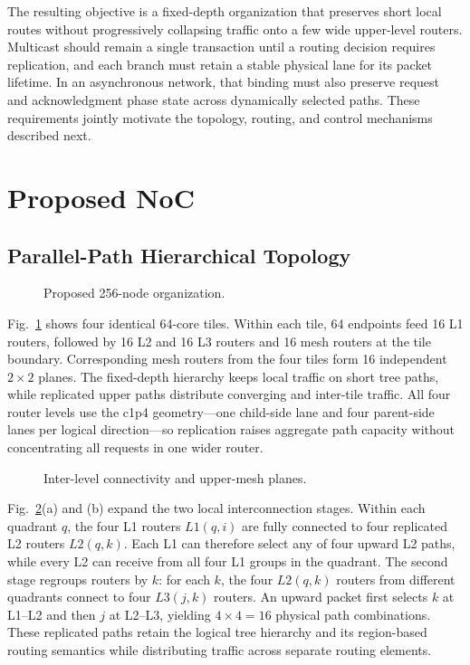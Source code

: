 \documentclass[conference]{IEEEtran}
\begin{document}
The resulting objective is a fixed-depth organization that preserves short
local routes without progressively collapsing traffic onto a few wide
upper-level routers. Multicast should remain a single transaction until a
routing decision requires replication, and each branch must retain a
stable physical lane for its packet lifetime. In an asynchronous network,
that binding must also preserve request and acknowledgment phase state
across dynamically selected paths. These requirements jointly motivate
the topology, routing, and control mechanisms described next.

\section{Proposed NoC}\label{sec:proposed}

\subsection{Parallel-Path Hierarchical Topology}\label{sec:topology}



\begin{figure}[!t]
\centering

\caption{Proposed 256-node organization.}
\label{fig:topology-overview}
\end{figure}

Fig.~\ref{fig:topology-overview} shows four identical 64-core tiles.
Within each tile, 64 endpoints feed 16 L1 routers, followed by 16 L2 and
16 L3 routers and 16 mesh routers at the tile boundary. Corresponding
mesh routers from the four tiles form 16 independent \(2\times2\) planes.
The fixed-depth hierarchy keeps local traffic on short tree paths, while
replicated upper paths distribute converging and inter-tile traffic. All
four router levels use the c1p4 geometry---one child-side lane and four
parent-side lanes per logical direction---so replication raises aggregate
path capacity without concentrating all requests in one wider router.

\begin{figure}[!t]
\centering

\caption{Inter-level connectivity and upper-mesh planes.}
\label{fig:topology-connectivity}
\end{figure}

Fig.~\ref{fig:topology-connectivity}(a) and (b) expand the two local
interconnection stages. Within each quadrant \(q\), the four L1 routers
\(L1(q,i)\) are fully connected to four replicated L2 routers \(L2(q,k)\).
Each L1 can therefore select any of four upward L2 paths, while every L2
can receive from all four L1 groups in the quadrant. The second stage
regroups routers by \(k\): for each \(k\), the four \(L2(q,k)\) routers
from different quadrants connect to four \(L3(j,k)\) routers. An upward
packet first selects \(k\) at L1--L2 and then \(j\) at L2--L3, yielding
\(4\times4=16\) physical path combinations. These replicated paths retain
the logical tree hierarchy and its region-based routing semantics while
distributing traffic across separate routing elements.
\end{document}

